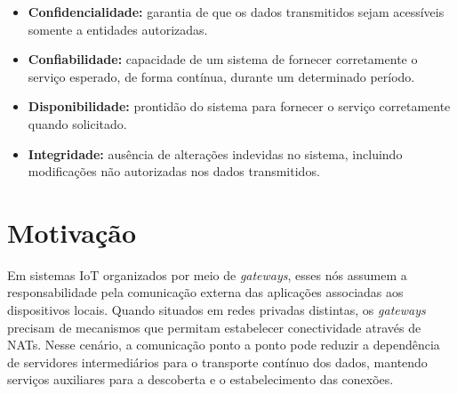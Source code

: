 \begin{itemize}
    \item \textbf{Confidencialidade:} garantia de que os dados transmitidos sejam acessíveis somente a entidades autorizadas.
    \item \textbf{Confiabilidade:} capacidade de um sistema de fornecer corretamente o serviço esperado, de forma contínua, durante um determinado período.
    \item \textbf{Disponibilidade:} prontidão do sistema para fornecer o serviço corretamente quando solicitado.
    \item \textbf{Integridade:} ausência de alterações indevidas no sistema, incluindo modificações não autorizadas nos dados transmitidos.
\end{itemize}
\section{Motivação}

Em sistemas IoT organizados por meio de \textit{gateways}, esses nós assumem a responsabilidade pela comunicação externa das aplicações associadas aos dispositivos locais. Quando situados em redes privadas distintas, os \textit{gateways} precisam de mecanismos que permitam estabelecer conectividade através de NATs. Nesse cenário, a comunicação ponto a ponto pode reduzir a dependência de servidores intermediários para o transporte contínuo dos dados, mantendo serviços auxiliares para a descoberta e o estabelecimento das conexões.

